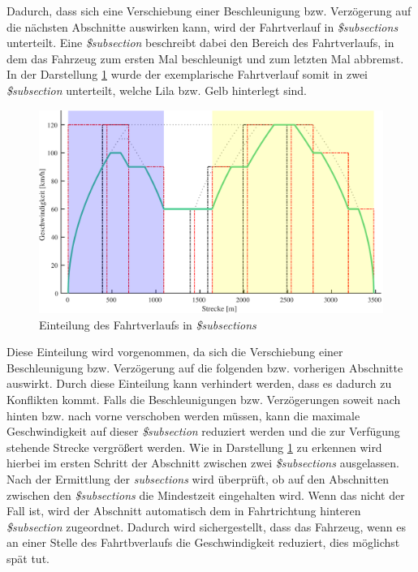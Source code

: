 Dadurch, dass sich eine Verschiebung einer Beschleunigung bzw. Verzögerung auf die nächsten Abschnitte auswirken kann, wird der Fahrtverlauf in \textit{\$subsections} unterteilt. Eine \textit{\$subsection} beschreibt dabei den Bereich des Fahrtverlaufs, in dem das Fahrzeug zum ersten Mal beschleunigt und zum letzten Mal abbremst. In der Darstellung \ref{fig:it7} wurde der exemplarische Fahrtverlauf somit in zwei \textit{\$subsection} unterteilt, welche Lila bzw. Gelb hinterlegt sind.
\begin{figure}
  \includegraphics[width=\linewidth]{../matlab/it7.pdf}
  \caption{Einteilung des Fahrtverlaufs in \textit{\$subsections}}
  \label{fig:it7}
\end{figure}
Diese Einteilung wird vorgenommen, da sich die Verschiebung einer Beschleunigung bzw. Verzögerung auf die folgenden bzw. vorherigen Abschnitte auswirkt. Durch diese Einteilung kann verhindert werden, dass es dadurch zu Konflikten kommt. Falls die Beschleunigungen bzw. Verzögerungen soweit nach hinten bzw. nach vorne verschoben werden müssen, kann die maximale Geschwindigkeit auf dieser \textit{\$subsection} reduziert werden und die zur Verfügung stehende Strecke vergrößert werden. Wie in Darstellung \ref{fig:it7} zu erkennen wird hierbei im ersten Schritt der Abschnitt zwischen zwei \textit{\$subsections} ausgelassen. Nach der Ermittlung der \textit{subsections} wird überprüft, ob auf den Abschnitten zwischen den \textit{\$subsections} die Mindestzeit eingehalten wird. Wenn das nicht der Fall ist, wird der Abschnitt automatisch dem in Fahrtrichtung hinteren \textit{\$subsection} zugeordnet. Dadurch wird sichergestellt, dass das Fahrzeug, wenn es an einer Stelle des Fahrtbverlaufs die Geschwindigkeit reduziert, dies möglichst spät tut.


